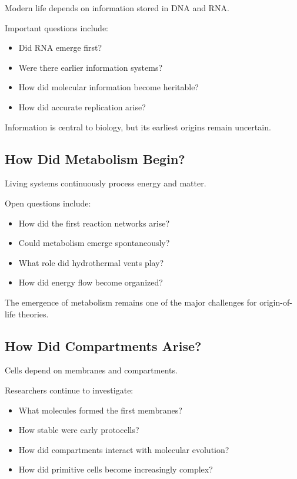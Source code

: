 \documentclass[
  oneside,
  openany]{book}
\providecommand{\tightlist}{%
  \setlength{\itemsep}{0pt}\setlength{\parskip}{0pt}}
\begin{document}
Modern life depends on information stored in DNA and RNA.

Important questions include:

\begin{itemize}
\tightlist
\item
  Did RNA emerge first?
\item
  Were there earlier information systems?
\item
  How did molecular information become heritable?
\item
  How did accurate replication arise?
\end{itemize}

Information is central to biology, but its earliest origins remain uncertain.

\subsection{How Did Metabolism Begin?}\label{how-did-metabolism-begin}

Living systems continuously process energy and matter.

Open questions include:

\begin{itemize}
\tightlist
\item
  How did the first reaction networks arise?
\item
  Could metabolism emerge spontaneously?
\item
  What role did hydrothermal vents play?
\item
  How did energy flow become organized?
\end{itemize}

The emergence of metabolism remains one of the major challenges for origin-of-life theories.

\subsection{How Did Compartments Arise?}\label{how-did-compartments-arise}

Cells depend on membranes and compartments.

Researchers continue to investigate:

\begin{itemize}
\tightlist
\item
  What molecules formed the first membranes?
\item
  How stable were early protocells?
\item
  How did compartments interact with molecular evolution?
\item
  How did primitive cells become increasingly complex?
\end{itemize}
\end{document}
